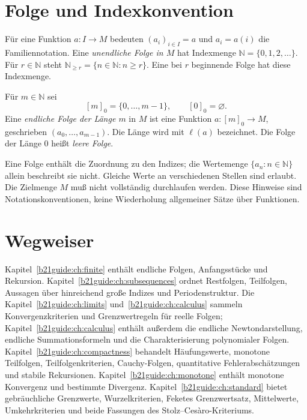 \section{Folge und Indexkonvention}

\begin{definition}
\label{b21guide:def:sequence}
Für eine Funktion $a\colon I\to M$ bedeuten
$(a_i)_{i\in I}=a$ und $a_i=a(i)$ die Familiennotation.
Eine \emph{unendliche Folge in $M$} hat Indexmenge
$\mathbb N=\{0,1,2,\ldots\}$.
Für $r\in\mathbb N$ steht
$\mathbb N_{\geq r}=\{n\in\mathbb N:n\geq r\}$.
Eine bei $r$ beginnende Folge hat diese Indexmenge.
\end{definition}

\begin{definition}
\label{b21guide:def:finite}
Für $m\in\mathbb N$ sei
\[
 [m]_0=\{0,\ldots,m-1\},\qquad [0]_0=\varnothing.
\]
Eine \emph{endliche Folge der Länge $m$} in $M$ ist eine Funktion
$a\colon[m]_0\to M$, geschrieben $(a_0,\ldots,a_{m-1})$.
Die Länge wird mit $\ell(a)$ bezeichnet.
Die Folge der Länge $0$ heißt \emph{leere Folge}.
\end{definition}

Eine Folge enthält die Zuordnung zu den Indizes; die Wertemenge
$\{a_n:n\in\mathbb N\}$ allein beschreibt sie nicht.
Gleiche Werte an verschiedenen Stellen sind erlaubt.
Die Zielmenge $M$ muß nicht vollständig durchlaufen werden.
Diese Hinweise sind Notationskonventionen, keine Wiederholung
allgemeiner Sätze über Funktionen.

\section{Wegweiser}

Kapitel~\ref{b21guide:ch:finite} enthält endliche Folgen,
Anfangsstücke und Rekursion.
Kapitel~\ref{b21guide:ch:subsequences} ordnet Restfolgen,
Teilfolgen, Aussagen über hinreichend große Indizes und Periodenstruktur.
Die Kapitel~\ref{b21guide:ch:limits} und~\ref{b21guide:ch:calculus}
sammeln Konvergenzkriterien und Grenzwertregeln für reelle Folgen;
Kapitel~\ref{b21guide:ch:calculus} enthält außerdem die endliche
Newtondarstellung, endliche Summationsformeln und die
Charakterisierung polynomialer Folgen.
Kapitel~\ref{b21guide:ch:compactness} behandelt Häufungswerte,
monotone Teilfolgen, Teilfolgenkriterien, Cauchy-Folgen,
quantitative Fehlerabschätzungen
und stabile Rekursionen.
Kapitel~\ref{b21guide:ch:monotone} enthält monotone Konvergenz
und bestimmte Divergenz.
Kapitel~\ref{b21guide:ch:standard} bietet gebräuchliche Grenzwerte,
Wurzelkriterien, Feketes Grenzwertsatz, Mittelwerte, Umkehrkriterien
und beide Fassungen
des Stolz--Cesàro-Kriteriums.
